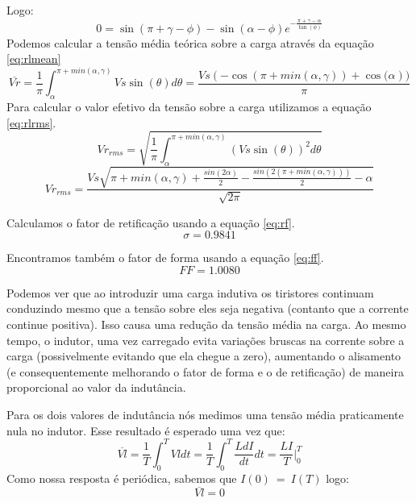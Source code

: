 \documentclass{article}
\begin{document}
Logo:
\begin{equation}
 0 = \sin(\pi + \gamma - \phi) - \sin(\alpha - \phi)e^{-\frac{\pi + \gamma - \alpha}{\tan(\phi)}}
\end{equation}
Podemos calcular a tensão média teórica sobre a carga através da equação \ref{eq:rlmean}
\begin{equation}
\overline{Vr} = \frac{1}{\pi} \int_{\alpha}^{\pi + min(\alpha, \gamma)}{Vs \sin{(\theta)}d\theta} = \frac{Vs (-\cos{(\pi + min(\alpha, \gamma))} + \cos{(\alpha}))}{\pi}
\label{eq:rlmean}
\end{equation}
Para calcular o valor efetivo da tensão sobre a carga utilizamos a equação \ref{eq:rlrms}.
\begin{equation}
Vr_{rms} = \sqrt{\frac{1}{\pi} \int_{\alpha}^{\pi + min(\alpha, \gamma)}{(Vs \sin(\theta))^2 d\theta}}
\end{equation}
\begin{equation}
Vr_{rms} = \frac{Vs \sqrt{\pi + min(\alpha, \gamma) + \frac{sin(2\alpha)}{2} - \frac{sin(2(\pi + min(\alpha, \gamma)))}{2} - \alpha }}{\sqrt{2 \pi}} 
\label{eq:rlrms}
\end{equation}

Calculamos o fator de retificação usando a equação \ref{eq:rf}.
\begin{equation}
\sigma =  0.9841
\end{equation}

Encontramos também o fator de forma usando a equação \ref{eq:ff}.
\begin{equation}
FF = 1.0080
\end{equation}

Podemos ver que ao introduzir uma carga indutiva os tiristores continuam conduzindo mesmo que a tensão sobre eles seja negativa (contanto que a corrente continue positiva). Isso causa uma redução da tensão média na carga. Ao mesmo tempo, o indutor, uma vez carregado evita variações bruscas na corrente sobre a carga (possivelmente evitando que ela chegue a zero), aumentando o alisamento (e consequentemente melhorando o fator de forma e o de retificação) de maneira proporcional ao valor da indutância.

Para os dois valores de indutância nós medimos uma tensão média praticamente nula no indutor. Esse resultado é esperado uma vez que:
\begin{equation}
	\overline{Vl} = \frac{1}{T}\int_{0}^{T}Vl dt = \frac{1}{T}\int_{0}^{T}\frac{LdI}{dt} dt = \frac{LI}{T}\bigg\rvert_0^T
\end{equation}
Como nossa resposta é periódica, sabemos que $I(0)\ =\ I(T)$ logo:
\begin{equation}
	\overline{Vl} = 0
\end{equation}
\end{document}

